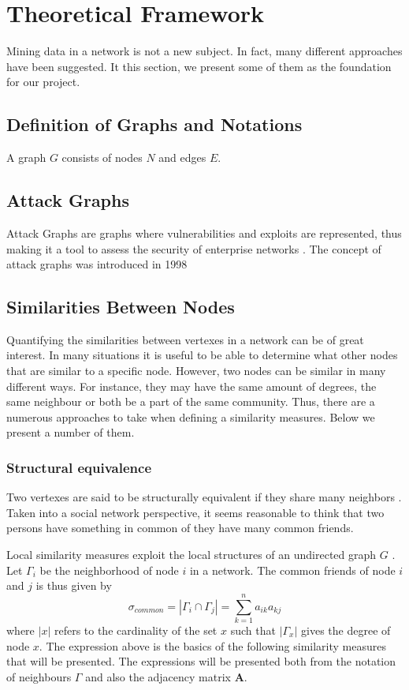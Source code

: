 \chapter{Theoretical Framework}
Mining data in a network is not a new subject. In fact, many different approaches have been suggested. It this section, we present some of them as the foundation for our project.

\section{Definition of Graphs and Notations}
A graph $G$ consists of nodes $N$ and edges $E$. 

\section{Attack Graphs}
Attack Graphs are graphs where vulnerabilities and exploits are represented, thus making it a tool to assess the security of enterprise networks \cite{barik2016}. The concept of attack graphs was introduced in 1998 

\section{Similarities Between Nodes \label{sim}}
Quantifying the similarities between vertexes in a network can be of great interest. In many situations it is useful to be able to determine what other nodes that are similar to a specific node. However, two nodes can be similar in many different ways. For instance, they may have the same amount of degrees, the same neighbour or both be a part of the same community. Thus, there are a numerous approaches to take when defining a similarity measures. Below we present a number of them. 

\subsection{Structural equivalence}
Two vertexes are said to be structurally equivalent if they share many neighbors \cite{leicht2006}. Taken into a social network perspective, it seems reasonable to think that two persons have something in common of they have many common friends. 

Local similarity measures exploit the local structures of an undirected graph $G$ \cite{fouss2016algorithms}. Let $\Gamma_i$ be the neighborhood of node $i$ in a network. The common friends of node $i$ and $j$ is thus given by
\begin{equation}
\sigma_{common} = |\Gamma_i \cap \Gamma_j| = \sum_{k=1}^n a_{ik}a_{kj}
\end{equation}
where $|x|$ refers to the cardinality of the set $x$ such that $|\Gamma_x |$ gives the degree of node $x$. The expression above is the basics of the following similarity measures that will be presented. The expressions will be presented both from the notation of neighbours $\Gamma$ and also the adjacency matrix $\textbf{A}$.

